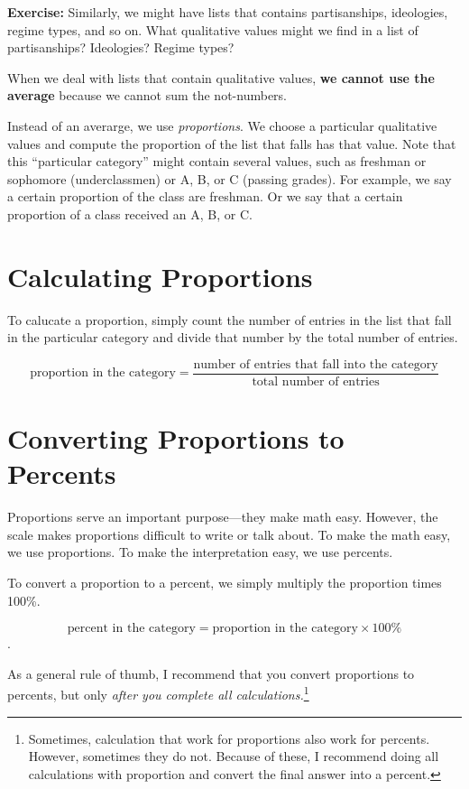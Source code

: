 \documentclass[]{book}
\let\rmarkdownfootnote\footnote%
\def\footnote{\protect\rmarkdownfootnote}
\theoremstyle{definition}
\theoremstyle{definition}
\theoremstyle{definition}
\theoremstyle{remark}
\begin{document}
\textbf{Exercise:} Similarly, we might have lists that contains
partisanships, ideologies, regime types, and so on. What qualitative
values might we find in a list of partisanships? Ideologies? Regime
types?

When we deal with lists that contain qualitative values, \textbf{we
cannot use the average} because we cannot sum the not-numbers.

Instead of an averarge, we use \emph{proportions}. We choose a
particular qualitative values and compute the proportion of the list
that falls has that value. Note that this ``particular category'' might
contain several values, such as freshman or sophomore (underclassmen) or
A, B, or C (passing grades). For example, we say a certain proportion of
the class are freshman. Or we say that a certain proportion of a class
received an A, B, or C.

\section{Calculating Proportions}\label{calculating-proportions}

To calucate a proportion, simply count the number of entries in the list
that fall in the particular category and divide that number by the total
number of entries.

\[\text{proportion in the category} = \dfrac{\text{number of entries that fall into the category}}{\text{total number of entries}}\]

\section{Converting Proportions to
Percents}\label{converting-proportions-to-percents}

Proportions serve an important purpose---they make math easy. However,
the scale makes proportions difficult to write or talk about. To make
the math easy, we use proportions. To make the interpretation easy, we
use percents.

To convert a proportion to a percent, we simply multiply the proportion
times 100\%.

\[\text{percent in the category} = \text{proportion in the category} \times 100\%\].

As a general rule of thumb, I recommend that you convert proportions to
percents, but only \emph{after you complete all calculations.}\footnote{Sometimes,
  calculation that work for proportions also work for percents. However,
  sometimes they do not. Because of these, I recommend doing all
  calculations with proportion and convert the final answer into a
  percent.}
\end{document}
